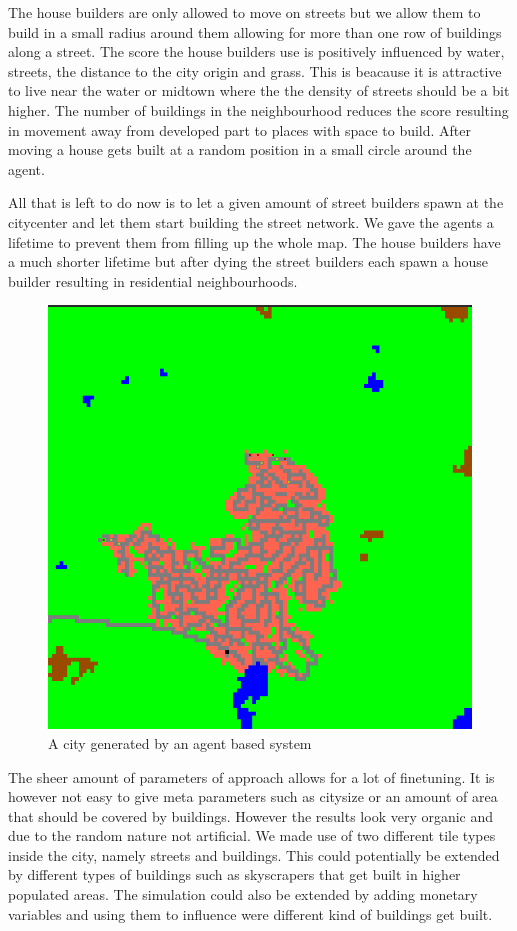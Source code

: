 \documentclass{scrartcl}
\begin{document}
The house builders are only allowed to move on streets but we allow them to build
in a small radius around them allowing for more than one row of buildings along a street.
The score the house builders use is positively influenced by water, streets, the
distance to the city origin and grass. This is beacause it is attractive to live
near the water or midtown where the the density of streets should be a bit higher.
The number of buildings in the neighbourhood reduces the score resulting in movement
away from developed part to places with space to build. After moving a house gets built
at a random position in a small circle around the agent.

All that is left to do now is to let a given amount of street builders spawn at the
citycenter and let them start  building the street network. We gave the agents
a lifetime to prevent them from filling up the whole map. The house builders
have a much shorter lifetime but after dying the street builders each  spawn a
house builder resulting in residential neighbourhoods.

\begin{figure}
  \centering
  \includegraphics[scale = 0.2]{city}
  \caption{A city generated by an agent based system}
\end{figure}

The sheer amount of parameters of approach allows for a lot of finetuning.
It is however not easy to give meta parameters such as citysize or an amount
of area that should be covered by buildings. However the results look very organic
and due to the random nature not artificial. We made use of two different tile types
inside the city, namely streets and buildings. This could potentially be extended
by different types of buildings such as skyscrapers that get built in higher
populated areas. The simulation could also be extended by adding monetary variables
and using them to influence were different kind of buildings get built.
\end{document}
